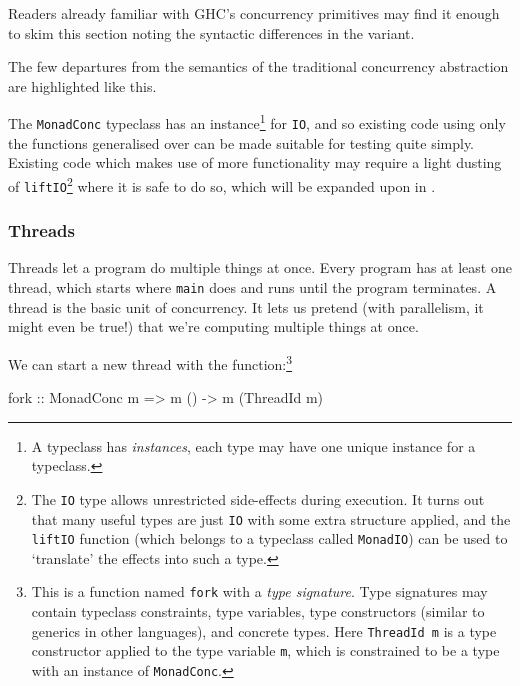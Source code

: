 Readers already familiar with GHC's concurrency primitives may find it
enough to skim this section noting the syntactic differences in the
\dejafu{} variant.

\begin{departure}
  The few departures from the semantics of the traditional concurrency
  abstraction are highlighted like this.
\end{departure}

The \verb|MonadConc| typeclass has an instance\footnote{A typeclass
  has \emph{instances}, each type may have one unique instance for a
  typeclass.} for \verb|IO|, and so existing code using only the
functions generalised over can be made suitable for testing quite
simply. Existing code which makes use of more functionality may
require a light dusting of \verb|liftIO|\footnote{The \texttt{IO} type
  allows unrestricted side-effects during execution. It turns out that
  many useful types are just \texttt{IO} with some extra structure
  applied, and the \texttt{liftIO} function (which belongs to a
  typeclass called \texttt{MonadIO}) can be used to `translate' the
  effects into such a type.} where it is safe to do so, which will be
expanded upon in .

\subsubsection{Threads}
\label{sec:abstraction-typeclass-threads}

Threads let a program do multiple things at once. Every program has at
least one thread, which starts where \verb|main| does and runs until
the program terminates. A thread is the basic unit of concurrency. It
lets us pretend (with parallelism, it might even be true!) that we're
computing multiple things at once.

We can start a new thread with the function:\footnote{This is a
  function named \texttt{fork} with a \emph{type signature}. Type
  signatures may contain typeclass constraints, type variables, type
  constructors (similar to generics in other languages), and concrete
  types. Here \texttt{ThreadId m} is a type constructor applied to the
  type variable \texttt{m}, which is constrained to be a type with an
  instance of \texttt{MonadConc}.}

\begin{haskellcode}
fork :: MonadConc m => m () -> m (ThreadId m)
\end{haskellcode}

